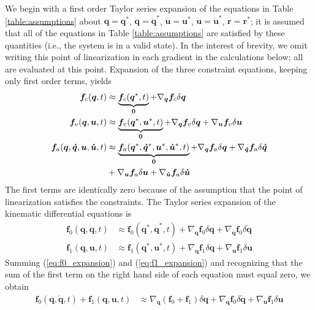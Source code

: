 \documentclass[smallcondensed,final]{svjour3}                     %
\begin{document}
We begin with a first order Taylor series expansion of the equations in Table
\ref{table:assumptions} about $\bm{q}=\bm{q}^*$, $\bm{\dot{q}}=\bm{\dot{q}}^*$,
$\bm{u}=\bm{u}^*$, $\bm{\dot{u}}=\bm{\dot{u}}^*$, $\bm{r}=\bm{r}^*$; it is
assumed that all of the equations in Table \ref{table:assumptions} are
satisfied by these quantities (i.e., the system is in a valid state).
In the interest of brevity, we omit writing this point of linearization in each
gradient in the calculations below; all are evaluated at this point.
Expansion of the three constraint equations, keeping only first order terms,
yields
\begin{align}
  \label{eq:configuration_expansion}
  \bm{f}_{c}(\bm{q}, t) &\approx \underbrace{\bm{f}_{c}(\bm{q}^*, t)}_{\bm{0}} +
  \nabla_{\bm{q}}\bm{f}_{c} \delta \bm{q}\\
  \label{eq:velocity_expansion}
  \bm{f}_{v}(\bm{q}, \bm{u}, t) &\approx \underbrace{\bm{f}_{v}(\bm{q}^*,
  \bm{u}^*, t)}_{\bm{0}} +  \nabla_{\bm{q}}\bm{f}_{v} \delta \bm{q} +
  \nabla_{\bm{u}}\bm{f}_{v} \delta \bm{u} \\
  \label{eq:acceleration_expansion}
  \bm{f}_{a}(\bm{q}, \bm{\dot{q}}, \bm{u}, \bm{\dot{u}}, t) &\approx
  \underbrace{\bm{f}_{a}(\bm{q}^*, \bm{\dot{q}}^*, \bm{u}^*, \bm{\dot{u}}^*,
t)}_{\bm{0}} +  \nabla_{\bm{q}}\bm{f}_{a} \delta \bm{q} +
\nabla_{\bm{\dot{q}}}\bm{f}_{a}
 \delta \bm{\dot{q}} \notag\\
&+ \nabla_{\bm{u}}\bm{f}_{a} \delta \bm{u} + \nabla_{\bm{\dot{u}}}\bm{f}_{a}
\delta \bm{\dot{u}}
\end{align}
The first terms are identically zero because of the assumption that the
point of linearization satisfies the constraints.  The Taylor series expansion
of the kinematic differential equations is
\begin{align}
  \label{eq:f0_expansion}
  \bm{f}_{0}(\bm{q}, \bm{\dot{q}}, t) &\approx \bm{f}_{0}(\bm{q}^*,
  \bm{\dot{q}}^*, t) + \nabla_{\bm{q}}\bm{f}_{0} \delta\bm{q} +
  \nabla_{\bm{\dot{q}}}\bm{f}_{0} \delta\bm{\dot{q}}\\
  \label{eq:f1_expansion}
  \bm{f}_{1}(\bm{q}, \bm{u}, t) &\approx \bm{f}_{1}(\bm{q}^*,
  \bm{u}^*, t) + \nabla_{\bm{q}}\bm{f}_{1} \delta\bm{q} +
  \nabla_{\bm{u}}\bm{f}_{1} \delta\bm{u}
\end{align}
Summing (\ref{eq:f0_expansion}) and (\ref{eq:f1_expansion}) and recognizing
that the sum of the first term on the right hand side of each equation must
equal zero, we obtain
\begin{align}
  \label{eq:f0_plus_f1_expansion}
  \bm{f}_{0}(\bm{q}, \bm{\dot{q}}, t) + \bm{f}_{1}(\bm{q}, \bm{u}, t) &\approx
  \nabla_{\bm{q}}(\bm{f}_{0} + \bm{f}_{1}) \delta\bm{q} +
  \nabla_{\bm{\dot{q}}}\bm{f}_{0} \delta\bm{\dot{q}} +
  \nabla_{\bm{u}}\bm{f}_{1} \delta\bm{u}
\end{align}
\end{document}
